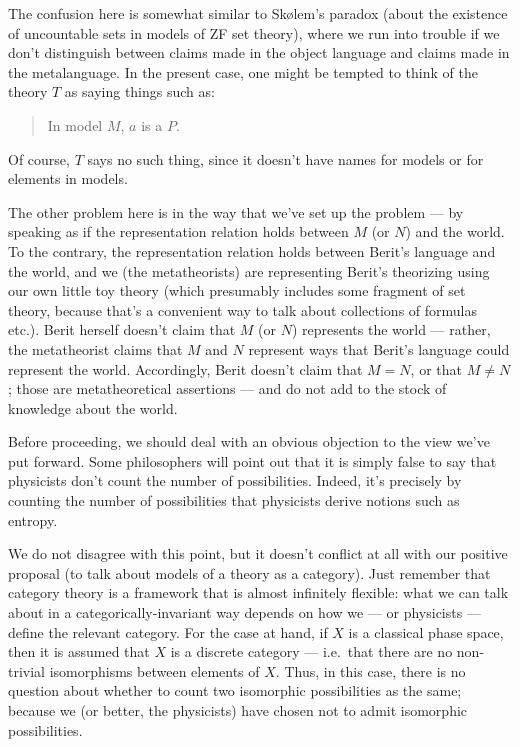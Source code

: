 \begin{example}
  The confusion here is somewhat similar to Sk{\o}lem's paradox (about
  the existence of uncountable sets in models of ZF set theory), where
  we run into trouble if we don't distinguish between claims made in
  the object language and claims made in the metalanguage.  In the
  present case, one might be tempted to think of the theory $T$ as
  saying things such as:
  \begin{quote} In model $M$, $a$ is a $P$. \end{quote} Of course, $T$
  says no such thing, since it doesn't have names for models or for
  elements in models.

  The other problem here is in the way that we've set up the problem
  --- by speaking as if the representation relation holds between $M$
  (or $N$) and the world.  To the contrary, the representation
  relation holds between Berit's language and the world, and we (the
  metatheorists) are representing Berit's theorizing using our own
  little toy theory (which presumably includes some fragment of set
  theory, because that's a convenient way to talk about collections of
  formulas etc.).  Berit herself doesn't claim that $M$ (or $N$)
  represents the world --- rather, the metatheorist claims that $M$
  and $N$ represent ways that Berit's language could represent the
  world.  Accordingly, Berit doesn't claim that $M=N$, or that
  $M\neq N$; those are metatheoretical assertions --- and do not add
  to the stock of knowledge about the world.  \end{example}

Before proceeding, we should deal with an obvious objection to the
view we've put forward.  Some philosophers will point out that it is
simply false to say that physicists don't count the number of
possibilities.  Indeed, it's precisely by counting the number of
possibilities that physicists derive notions such as entropy.

We do not disagree with this point, but it doesn't conflict at all
with our positive proposal (to talk about models of a theory as a
category).  Just remember that category theory is a framework that is
almost infinitely flexible: what we can talk about in a
categorically-invariant way depends on how we --- or physicists ---
define the relevant category.  For the case at hand, if $X$ is a
classical phase space, then it is assumed that $X$ is a discrete
category --- i.e.\ that there are no non-trivial isomorphisms between
elements of $X$.  Thus, in this case, there is no question about
whether to count two isomorphic possibilities as the same; because we
(or better, the physicists) have chosen not to admit isomorphic
possibilities.

